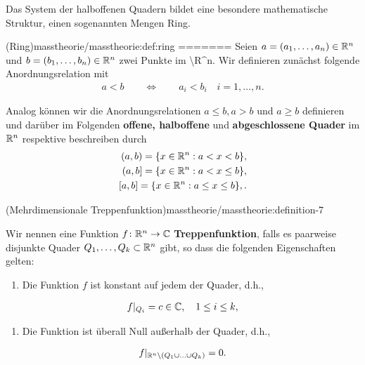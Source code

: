 \par
Das System der halboffenen Quadern bildet eine besondere mathematische Struktur, einen sogenannten Mengen Ring.
\begin{definition}{(Ring)}{masstheorie/masstheorie:def:ring}
=======
Seien \(a = (a_1,\ldots,a_n) \in \mathbb{R}^n\) und \(b = (b_1,\ldots,b_n) \in \mathbb{R}^n\) zwei Punkte im \textbackslash{}R\textasciicircum{}n.
Wir definieren zunächst folgende Anordnungsrelation mit
\begin{align*}
a < b \qquad \Leftrightarrow \qquad a_i < b_i \quad i=1,\ldots,n.
\end{align*}
\par
Analog können wir die Anordnungsrelationen \(a \leq b, a > b\) und \(a \geq b\) definieren und darüber im Folgenden \textbf{offene, halboffene} und \textbf{abgeschlossene Quader} im \(\mathbb{R}^n\) respektive beschreiben durch
\begin{align*}
(a,b) = \lbrace x \in \mathbb{R}^n : a < x < b \rbrace,\\
(a,b] = \lbrace x \in \mathbb{R}^n : a < x \leq b \rbrace,\\
[a,b] = \lbrace x \in \mathbb{R}^n : a \leq x \leq b \rbrace,.
\end{align*}\end{definition}
\begin{definition}{(Mehrdimensionale Treppenfunktion)}{masstheorie/masstheorie:definition-7}



\par
Wir nennen eine Funktion \(f \colon \mathbb{R}^n \rightarrow \mathbb{C}\) \textbf{Treppenfunktion}, falls es paarweise disjunkte Quader \(Q_1, \ldots, Q_k \subset \mathbb{R}^n\) gibt, so dass die folgenden Eigenschaften gelten:
\begin{enumerate}

\item {} 
\par
Die Funktion \(f\) ist konstant auf jedem der Quader, d.h.,

\end{enumerate}
\begin{align*}
f|_{Q_i} = c \in \mathbb{C}, \quad 1 \leq i \leq k,
\end{align*}\begin{enumerate}

\item {} 
\par
Die Funktion ist überall Null außerhalb der Quader, d.h.,

\end{enumerate}
\begin{align*}
f|_{\mathbb{R}^n \setminus (Q_1 \cup \ldots \cup Q_k)} = 0.
\end{align*}\end{definition}

